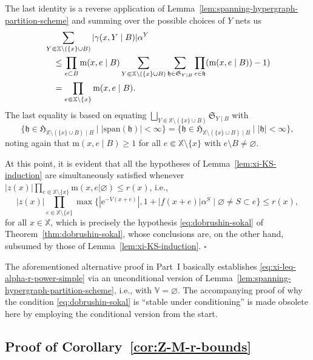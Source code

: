 \documentclass[10pt,a4paper]{amsart}
\newcommand{\e}{\mathrm{e}}
\newcommand{\X}{\mathbb X}
\newcommand{\V}{\mathbb V}
\begin{document}
The last identity is a reverse application of Lemma~\ref{lem:spanning-hypergraph-partition-scheme} and summing over the possible choices of $Y$ nets us
\begin{align}
	& \sum_{Y \Subset \X \setminus (\{x\} \cup B)} |\gamma(x, Y \mid B)| \alpha^Y \notag \\
	& \quad \leq \prod_{e \subset B} \mathrm{m}(x, e \mid B) \sum_{Y \Subset \X \setminus (\{x\} \cup B)} \sum_{\mathfrak h \in \mathfrak S_{Y \mid B}} \prod_{e \in \mathfrak h} (\mathrm{m}(x, e \mid B)) - 1) \notag \\
	& \quad = \prod_{e \Subset \X \setminus \{x\}} \mathrm{m}(x, e \mid B). \label{eq:sum-gamma-alpha-leq-Gamma-alpha}
\end{align}
The last equality is based on equating $\bigsqcup_{Y \Subset \X \setminus (\{x\} \cup B)} \mathfrak S_{Y \mid B}$ with
\[
	 \{\mathfrak h \in \mathfrak H_{\X \setminus (\{x\} \cup B) \mid B} \mid |\mathrm{span}(\mathfrak h)| < \infty\} = \{\mathfrak h \in \mathfrak H_{\X \setminus (\{x\} \cup B) \mid B} \mid |\mathfrak h| < \infty\},
\]
noting again that $\mathrm{m}(x, e \mid B) \geq 1$ for all $e \Subset \X \setminus \{x\}$ with $e \setminus B \neq \varnothing$.

At this point, it is evident that all the hypotheses of Lemma~\ref{lem:xi-KS-induction} are simultaneously satisfied whenever $|z(x)| \prod_{e \Subset \X \setminus \{x\}} \mathrm{m}(x, e | \varnothing) \leq r(x)$, i.e.,
\[
	|z(x)| \prod_{e \Subset \X \setminus \{x\}} \max\{|\e^{-V(x+e)}|, 1 + |f(x + e)| \alpha^S \mid \varnothing \neq S \subset e\} \leq r(x),
\]
for all $x \in \X$, which is precisely the hypothesis \eqref{eq:dobrushin-sokal} of Theorem~\ref{thm:dobrushin-sokal}, whose conclusions are, on the other hand, subsumed by those of Lemma~\ref{lem:xi-KS-induction}.
\hfill $\square$
\medskip

The aforementioned alternative proof in Part~I basically establishes \eqref{eq:xi-leq-alpha-r-power-simple} via an unconditional version of Lemma~\ref{lem:spanning-hypergraph-partition-scheme}, i.e., with $\V = \varnothing$. 
The accompanying proof of why the condition \eqref{eq:dobrushin-sokal} is ``stable under conditioning'' is made obsolete here by employing the conditional version from the start.

\subsection{Proof of Corollary~\ref{cor:Z-M-r-bounds}}
\end{document}
